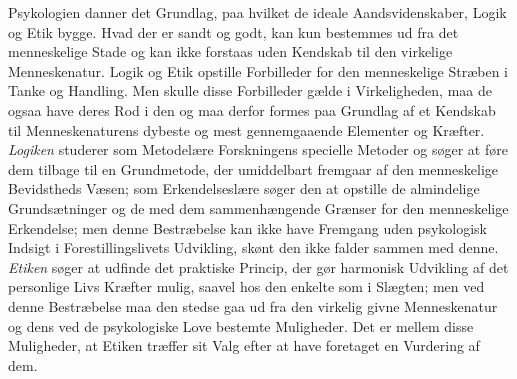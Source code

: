 \documentclass[12pt,a4paper,openany]{book}
\newcommand{\opage}[1]{\marginnote{\footnotesize\textit{[#1]}}}
\begin{document}
Psykologien danner det Grundlag, paa hvilket de ideale Aandsvidenskaber,
Logik og Etik bygge. Hvad der er sandt og godt, kan kun bestemmes ud fra
det menneskelige Stade og kan ikke forstaas uden Kendskab til den
virkelige Menneskenatur. Logik og Etik opstille Forbilleder for den
menneskelige Stræben i Tanke og Handling. Men skulle disse Forbilleder
gælde i Virkeligheden, maa de ogsaa have deres Rod i den og maa derfor
formes paa Grundlag af et Kendskab til Menneskenaturens dybeste og mest
gennemgaaende Elementer og Kræfter. \emph{Logiken} studerer som
Metodelære Forskningens specielle Metoder og søger at føre dem tilbage
til en Grundmetode, der umiddelbart fremgaar af den menneskelige
Bevidstheds Væsen;
\opage{34}som Erkendelseslære søger den at opstille de almindelige
Grundsætninger og de med dem sammenhængende Grænser for den menneskelige
Erkendelse; men denne Bestræbelse kan ikke have Fremgang uden
psykologisk Indsigt i Forestillingslivets Udvikling, skønt den ikke
falder sammen med denne. \emph{Etiken} søger at udfinde det praktiske
Princip, der gør harmonisk Udvikling af det personlige Livs Kræfter
mulig, saavel hos den enkelte som i Slægten; men ved denne Bestræbelse
maa den stedse gaa ud fra den virkelig givne Menneskenatur og dens ved
de psykologiske Love bestemte Muligheder. Det er mellem disse
Muligheder, at Etiken træffer sit Valg efter at have foretaget en
Vurdering af dem.
\end{document}
